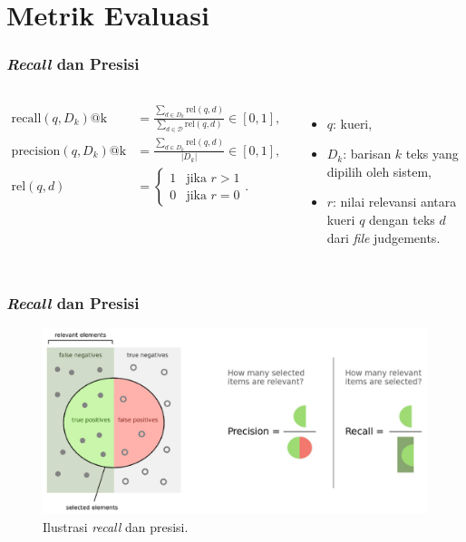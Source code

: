 \documentclass{beamer}
\newcommand{\f}[1]{\textit{#1}}
\begin{document}
\section{Metrik Evaluasi}

\begin{frame}
    \frametitle{\f{Recall} dan Presisi}
    \begin{columns}
        \begin{align*}
            \text{recall}(q, D_k)\text{@k} &= \frac{\sum_{d \in D_k} \text{rel}(q, d)}{\sum_{d \in \mathcal{D}} \text{rel}(q, d)} \in [0, 1], \\ 
            \text{precision}(q, D_k)\text{@k} &= \frac{\sum_{d \in D_k} \text{rel}(q, d)}{|D_k|} \in [0, 1], \\
            \text{rel}(q, d) &= \begin{cases} 
            1 & \text{jika } r > 1 \\
            0 & \text{jika } r = 0
            \end{cases}.
        \end{align*}

        \begin{itemize}
            \item $q$: kueri,
            \item $D_k$: barisan $k$ teks yang dipilih oleh sistem,
            \item $r$: nilai relevansi antara kueri $q$ dengan teks $d$ dari \f{file} judgements.
        \end{itemize}
    \end{columns}
\end{frame}

\begin{frame}
    \frametitle{\f{Recall} dan Presisi}
    \begin{figure}[!ht]
        \centering
        \includegraphics[width=1\textwidth]{assets/pics/recall-presisi.png}
        \caption{Ilustrasi \f{recall} dan presisi.}
        \label{fig:recall-precision}
    \end{figure}
\end{frame}
\end{document}
